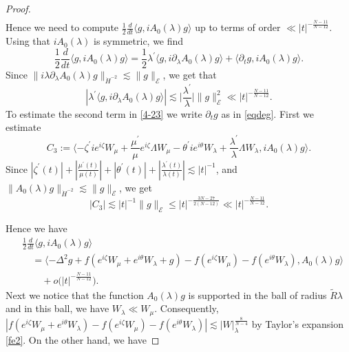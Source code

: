 \documentclass[10pt,a4paper]{amsart}
\begin{document}
\begin{proof}
\begin{align}
\end{align}
Hence we need to compute $ \frac{1}{2} \frac{d}{dt} \langle g, iA_0 (\lambda ) g \rangle$ up to terms of order $\ll |t|^{-\frac{N-11}{N-12}}$.
Using that $iA_0 (\lambda)$ is symmetric, we find
\begin{equation}\label{4-23}
\frac{1}{2} \frac{d}{dt} \langle g, iA_0 (\lambda ) g \rangle  = \frac{1}{2}\lambda^\prime \langle g, i\partial_\lambda A_0 (\lambda) g \rangle + \langle \partial_t g , iA_0 (\lambda) g\rangle.
\end{equation}
Since $\|i\lambda \partial_\lambda A_0 (\lambda) g \|_{\dot{H}^{-2}} \lesssim \|g\|_{\mathcal{E}}$, we get that
$$|\lambda^\prime \langle g, i\partial_\lambda A_0 (\lambda) g \rangle| \lesssim \big|\frac{\lambda^\prime}{\lambda}\big| \|g\|_{\mathcal{E}}^2
\ll |t|^{-\frac{N-11}{N-12}} .$$
To estimate the second term in \eqref{4-23} we write
 $\partial_t g$ as in \eqref{eqdeg}. First we estimate 
 $$C_3:=\langle -  \zeta^\prime i e^{i\zeta} W_\mu + \frac{\mu^\prime}{\mu} e^{i\zeta}\Lambda W_\mu -\theta^\prime i e^{i\theta} W_\lambda + \frac{\lambda^\prime}{\lambda} \Lambda W_\lambda , iA_0(\lambda) g \rangle . $$
Since $|\zeta^\prime (t)| +|\frac{\mu^\prime (t)}{\mu (t)}| + |\theta^\prime (t)|+ |\frac{\lambda^\prime (t)}{\lambda (t)}|\lesssim |t|^{-1} $, and $\|A_0 (\lambda) g\|_{\dot{H}^{-2}}\lesssim \|g\|_{\mathcal{E}}$, we get
$$|C_3|\lesssim |t|^{-1}\|g\|_{\mathcal{E}}
\le |t|^{-\frac{3N-27}{2(N-12)}}\ll |t|^{-\frac{N-11}{N-12}}. $$

Hence we have
\begin{align*}
&
\frac{1}{2} \frac{d}{dt} \langle g, iA_0 (\lambda ) g \rangle \\
&\quad= \langle -\Delta^2 g + f(e^{i\zeta} W_\mu +e^{i\theta}W_\lambda +g)- f(e^{i\zeta} W_\mu) - f(e^{i\theta} W_\lambda)  , A_0 (\lambda )g\rangle\\
&\qquad
+o\big(|t|^{-\frac{N-11}{N-12}}\big) .
\end{align*}
Next we notice that the function $A_0 (\lambda ) g$ is supported in the ball of radius $\tilde{R}\lambda$ and in this ball, we have $W_\lambda \ll W_\mu$. Consequently,  
$|f(e^{i\zeta} W_\mu +e^{i\theta}W_\lambda) - f(e^{i\zeta}W_\mu)- f (e^{i\theta}W_\lambda)|\lesssim |W|_\lambda^{\frac{8}{N-4}}$ by Taylor's expansion \eqref{fe2}. On the other hand, we have

\end{proof}
\end{document}
